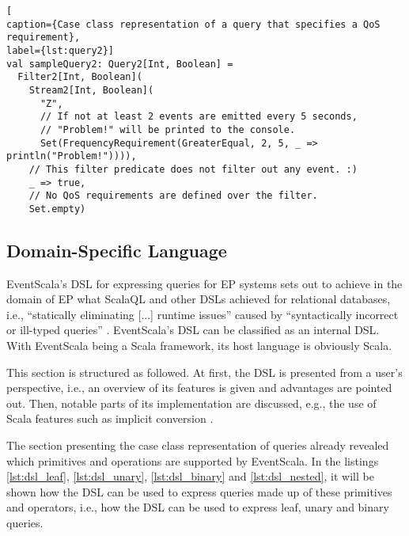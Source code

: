 \documentclass[article, type=bsc, colorback, accentcolor=tud8b, parskip=half, bibliography=totocnumbered]{tudthesis}
\begin{document}
\begin{lstlisting}[
caption={Case class representation of a query that specifies a QoS requirement},
label={lst:query2}]
val sampleQuery2: Query2[Int, Boolean] =
  Filter2[Int, Boolean](
    Stream2[Int, Boolean](
      "Z",
      // If not at least 2 events are emitted every 5 seconds,
      // "Problem!" will be printed to the console.
      Set(FrequencyRequirement(GreaterEqual, 2, 5, _ => println("Problem!")))),
    // This filter predicate does not filter out any event. :)
    _ => true,
    // No QoS requirements are defined over the filter.
    Set.empty)
\end{lstlisting}

\subsection{Domain-Specific Language}
\label{sec:dsl}

EventScala's DSL for expressing queries for EP systems sets out to achieve in the domain of EP what ScalaQL and other DSLs achieved for relational databases, i.e., ``statically eliminating [...] runtime issues'' \cite{Spiewak:2009:SLD:2127907.2127923} caused by ``syntactically incorrect or ill-typed queries'' \cite{Leijen:1999:DSE:331960.331977}.
EventScala's DSL can be classified as an internal DSL.
With EventScala being a Scala framework, its host language is obviously Scala.

This section is structured as followed. 
At first, the DSL is presented from a user's perspective, i.e., an overview of its features is given and advantages are pointed out.
Then, notable parts of its implementation are discussed, e.g., the use of Scala features such as implicit conversion \cite{pimp}.

The section presenting the case class representation of queries already revealed which primitives and operations are supported by EventScala.
In the listings \ref{lst:dsl_leaf}, \ref{lst:dsl_unary}, \ref{lst:dsl_binary} and \ref{lst:dsl_nested}, it will be shown how the DSL can be used to express queries made up of these primitives and operators, i.e., how the DSL can be used to express leaf, unary and binary queries.
\end{document}
